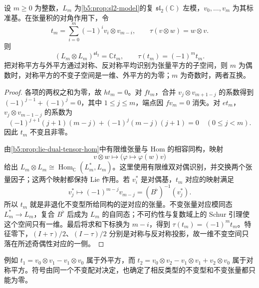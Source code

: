 \begin{proposition}\label{b5:prop:sl2-invariant-tensor}
	设 \(m\ge0\) 为整数，\(L_m\) 为\cref{b5:prop:sl2-model}的复 \(\mathfrak{sl}_2(\mathbb C)\) 左模，\(v_0,\ldots,v_m\) 为其标准基。在张量积的对角作用下，令
	\[
		t_m=\sum_{i=0}^m(-1)^i v_i\otimes v_{m-i},\qquad \tau(v\otimes w)=w\otimes v.
	\]
	则
	\[
		(L_m\otimes L_m)^{\mathfrak{sl}_2}=\mathbb Ct_m, \qquad \tau(t_m)=(-1)^m t_m.
	\]
	把对称平方与外平方通过对称、反对称平均识别为张量平方的子空间，则 \(m\) 为偶数时，对称平方的不变子空间是一维、外平方的为零；\(m\) 为奇数时，两者互换。
\end{proposition}
\begin{proof}
	各项的两权之和为零，故 \(ht_m=0\)。对 \(ft_m\)，合并 \(v_j\otimes v_{m+1-j}\) 的系数得到 \((-1)^{j-1}+(-1)^j=0\)，其中 \(1\le j\le m\)，端点因 \(fv_m=0\) 消失。对 \(et_m\)，\(v_j\otimes v_{m-1-j}\) 的系数为
	\[
		(-1)^{j+1}(j+1)(m-j)+(-1)^j(m-j)(j+1)=0 \quad(0\le j<m).
	\]
	因此 \(t_m\) 不变且非零。

	由\cref{b5:prop:lie-dual-tensor-hom}中有限维张量与 Hom 的相容同构，映射
	\[
		v\otimes w\longmapsto\bigl(\varphi\mapsto\varphi(w)v\bigr)
	\]
	给出 \(L_m\otimes L_m\cong\operatorname{Hom}_{\mathbb C}(L_m^*,L_m)\)。这里使用有限维双对偶识别，并交换两个张量因子；这两个映射都保持 Lie 作用。若 \(v_i^*\) 是对偶基，\(t_m\) 对应的映射满足
	\[
		v_j^*\longmapsto(-1)^{m-j}v_{m-j}=(B^\flat)^{-1}(v_j^*).
	\]
	所以 \(t_m\) 就是非退化不变型所给同构的逆对应的张量。不变张量对应模同态 \(L_m^*\to L_m\)，复合 \(B^\flat\) 后成为 \(L_m\) 的自同态；不可约性与复数域上的 Schur 引理使这个空间只有一维。最后将求和下标换为 \(m-i\)，得到 \(\tau(t_m)=(-1)^m t_m\)。特征零下，\((I+\tau)/2\)、\((I-\tau)/2\) 分别是对称与反对称投影，故一维不变空间只落在所述奇偶性对应的一侧。
\end{proof}
例如 \(t_1=v_0\otimes v_1-v_1\otimes v_0\) 属于外平方，而 \(t_2=v_0\otimes v_2-v_1\otimes v_1+v_2\otimes v_0\) 属于对称平方。符号由同一个不变配对决定，也确定了相反类型的不变型和不变张量都只能为零。
